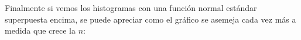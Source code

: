 \documentclass[a4paper]{article}
\begin{document}
	Finalmente si vemos los histogramas con una funci\'on normal est\'andar superpuesta encima, se puede apreciar como el gr\'afico se asemeja cada vez m\'as a medida que crece la $n$:
	
	\begin{figure}[H]
		\centering
		\hfill
	\end{figure}
	
\end{document}
